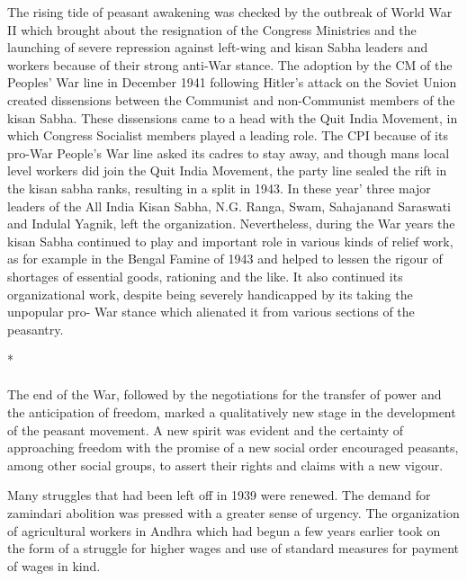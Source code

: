 The rising tide of peasant awakening was checked by the outbreak of World War II which brought about the resignation of the Congress Ministries and the launching of severe repression against left-wing and kisan Sabha leaders and workers because of their strong anti-War stance. The adoption by the CM of the Peoples' War line in December 1941 following Hitler's attack on the Soviet Union created dissensions between the Communist and non-Communist members of the kisan Sabha. These dissensions came to a head with the Quit India Movement, in which Congress Socialist members played a leading role. The CPI because of its pro-War People's War line asked its cadres to stay away, and though mans local level workers did join the Quit India Movement, the party line sealed the rift in the kisan sabha ranks, resulting in a split in 1943. In these year' three major leaders of the All India Kisan Sabha, N.G. Ranga, Swam, Sahajanand Saraswati and Indulal Yagnik, left the organization. Nevertheless, during the War years the kisan Sabha continued to play and important role in various kinds of relief work, as for example in the Bengal Famine of 1943 and helped to lessen the rigour of shortages of essential goods, rationing and the like. It also continued its organizational work, despite being severely handicapped by its taking the unpopular pro- War stance which alienated it from various sections of the peasantry.

\begin{center}*\end{center}

\paragraph*{}


The end of the War, followed by the negotiations for the transfer of power and the anticipation of freedom, marked a qualitatively new stage in the development of the peasant movement. A new spirit was evident and the certainty of approaching freedom with the promise of a new social order encouraged peasants, among other social groups, to assert their rights and claims with a new vigour.

Many struggles that had been left off in 1939 were renewed. The demand for zamindari abolition was pressed with a greater sense of urgency. The organization of agricultural workers in Andhra which had begun a few years earlier took on the form of a struggle for higher wages and use of standard measures for payment of wages in kind.

